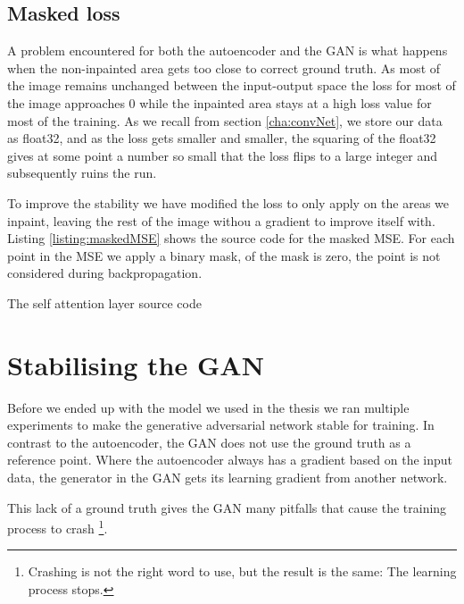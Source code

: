 \subsection{Masked loss}
A problem encountered for both the autoencoder and the GAN is what happens when the non-inpainted area gets too close to correct ground truth. 
As most of the image remains unchanged between the input-output space the loss for most of the image approaches 0 while the inpainted area stays at a high loss value for most of the training. 
As we recall from section \ref{cha:convNet}, we store our data as float32, and as the loss gets smaller and smaller, the squaring of the float32 gives at some point a number so small that the loss flips to a large integer and subsequently ruins the run. 



To improve the stability we have modified the loss to only apply on the areas we inpaint, leaving the rest of the image withou a gradient to improve itself with.
Listing \ref{listing:maskedMSE} shows the source code for the masked MSE. 
For each point in the MSE we apply a binary mask, of the mask is zero, the point is not considered during backpropagation.


\begin{minipage}{\linewidth}
\begin{listing}

\caption{The self attention layer source code}
\label{listing:maskedMSE}
\end{listing}
\end{minipage}





\section{Stabilising the GAN}
Before we ended up with the model we used in the thesis we ran multiple experiments to make the generative adversarial network stable for training. 
In contrast to the autoencoder, the GAN does not use the ground truth as a reference point. Where the autoencoder always has a gradient based on the input data, the generator in the GAN gets its learning gradient from another network.

This lack of a ground truth gives the GAN many pitfalls that cause the training process to crash \footnote{Crashing is not the right word to use, but the result is the same: The learning process stops.}.


